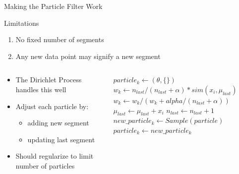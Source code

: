 \documentclass[compress]{beamer}
\begin{document}
\begin{frame}{Making the Particle Filter Work}

\begin{block}{Limitations}
\begin{enumerate}
\item No fixed number of segments
\item Any new data point may signify a new segment
\end{enumerate}
\end{block}

\pause

\begin{columns}[t]
\begin{column}[1]{5cm}

\begin{itemize}
\item The Dirichlet Process handles this well
\item Adjust each particle by:
\begin{itemize}
    \item adding new segment 
    \item updating last segment
\end{itemize}
\item Should regularize to limit number of particles
\end{itemize}
\end{column}

\begin{column}[2]{5cm}

\tiny{
\begin{algorithm}[H]
$particle_k \leftarrow (\theta, \{\})$ \\
 {
     {
        $w_k \leftarrow n_{last} / (n_{last}+\alpha) * sim(x_i, \mu_{last})$ \\
        $w_k \leftarrow w_k / (w_k + alpha / (n_{last} + \alpha))$ \\
         {
            $\mu_{last} \leftarrow \mu_{last} + x_i$
            $n_{last} \leftarrow n_{last} + 1$
        } 
    }
    $new\_particle_k \leftarrow Sample(particle)$ \\
    $particle_k \leftarrow new\_particle_k$ \\
}
\end{algorithm}
}
\end{column}
\end{columns}
\end{frame}
\end{document}
